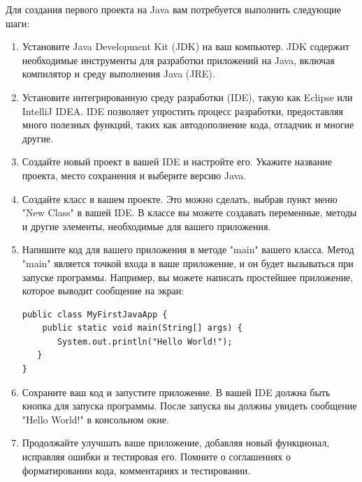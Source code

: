 Для создания первого проекта на Java вам потребуется выполнить следующие шаги:
\begin{enumerate}
\item Установите Java Development Kit (JDK) на ваш компьютер. JDK содержит необходимые инструменты для разработки приложений на Java, включая компилятор и среду выполнения Java (JRE).
\item Установите интегрированную среду разработки (IDE), такую как Eclipse или IntelliJ IDEA. IDE позволяет упростить процесс разработки, предоставляя много полезных функций, таких как автодополнение кода, отладчик и многие другие.
\item Создайте новый проект в вашей IDE и настройте его. Укажите название проекта, место сохранения и выберите версию Java.
\item Создайте класс в вашем проекте. Это можно сделать, выбрав пункт меню "New Class" в вашей IDE. В классе вы можете создавать переменные, методы и другие элементы, необходимые для вашего приложения.
\item Напишите код для вашего приложения в методе "main" вашего класса. Метод "main" является точкой входа в ваше приложение, и он будет вызываться при запуске программы. Например, вы можете написать простейшее приложение, которое выводит сообщение на экран:
\begin{lstlisting}
public class MyFirstJavaApp {
    public static void main(String[] args) {
       System.out.println("Hello World!");
   }
}
\end{lstlisting}
\item Сохраните ваш код и запустите приложение. В вашей IDE должна быть кнопка для запуска программы. После запуска вы должны увидеть сообщение "Hello World!" в консольном окне.
\item Продолжайте улучшать ваше приложение, добавляя новый функционал, исправляя ошибки и тестировая его. Помните о соглашениях о форматировании кода, комментариях и тестировании.
\end{enumerate}

